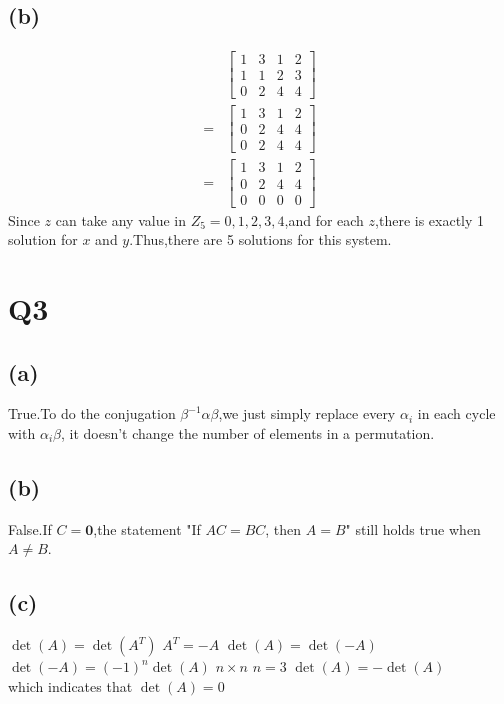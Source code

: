 \documentclass[12pt]{article}
\begin{document}
	\subsection*{(b)}
		$$
		\begin{aligned}
		& {\left[\begin{array}{lll|l}
		1 & 3 & 1 & 2 \\
		1 & 1 & 2 & 3 \\
		0 & 2 & 4 & 4
		\end{array}\right] } \\
		= & {\left[\begin{array}{lll|l}
		1 & 3 & 1 & 2 \\
		0 & 2 & 4 & 4 \\
		0 & 2 & 4 & 4
		\end{array}\right] } \\
		= & {\left[\begin{array}{lll|l}
		1 & 3 & 1 & 2 \\
		0 & 2 & 4 & 4 \\
		0 & 0 & 0 & 0
		\end{array}\right] }
		\end{aligned}
		$$
		Since $z$ can take any value in $Z_5 = {0,1,2,3,4}$,and for each $z$,there is exactly 1 solution for $x$ and $y$.Thus,there are 5 solutions for this system.

\section{Q3}
	\subsection*{(a)}
		True.To do the conjugation $\beta^{-1} \alpha \beta$,we just simply replace every $\alpha_i$  in each cycle with $\alpha_i \beta$, it doesn't change the number of elements in a permutation.
	\subsection*{(b)}
		False.If $C = \textbf{0}$,the statement "If $AC = BC$, then $A = B$" still holds true when $A \neq B$.
	\subsection*{(c)}
		 \(\det(A) = \det(A^T)\) \(A^T = -A\) \(\det(A) = \det(-A)\) \(\det(-A) = (-1)^n \det(A)\)  \(n \times n\)  \(n = 3\)  \(\det(A) = -\det(A)\)\
		\\ which indicates that  \(\det(A) = 0\)
\end{document}
